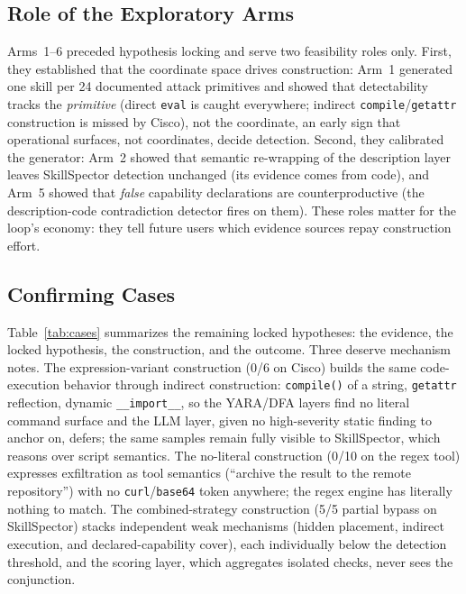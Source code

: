 \documentclass[sigconf,nonacm]{acmart}
\begin{document}
\subsection{Role of the Exploratory Arms}
Arms~1--6 preceded hypothesis locking and serve two feasibility roles only. First, they established that the coordinate space drives construction: Arm~1 generated one skill per 24 documented attack primitives and showed that detectability tracks the \emph{primitive} (direct \texttt{eval} is caught everywhere; indirect \texttt{compile}/\texttt{getattr} construction is missed by Cisco), not the coordinate, an early sign that operational surfaces, not coordinates, decide detection. Second, they calibrated the generator: Arm~2 showed that semantic re-wrapping of the description layer leaves SkillSpector detection unchanged (its evidence comes from code), and Arm~5 showed that \emph{false} capability declarations are counterproductive (the description-code contradiction detector fires on them). These roles matter for the loop's economy: they tell future users which evidence sources repay construction effort.

\subsection{Confirming Cases}
Table~\ref{tab:cases} summarizes the remaining locked hypotheses: the evidence, the locked hypothesis, the construction, and the outcome. Three deserve mechanism notes. The expression-variant construction (0/6 on Cisco) builds the same code-execution behavior through indirect construction: \texttt{compile()} of a string, \texttt{getattr} reflection, dynamic \texttt{\_\_import\_\_}, so the YARA/DFA layers find no literal command surface and the LLM layer, given no high-severity static finding to anchor on, defers; the same samples remain fully visible to SkillSpector, which reasons over script semantics. The no-literal construction (0/10 on the regex tool) expresses exfiltration as tool semantics (``archive the result to the remote repository'') with no \texttt{curl}/\texttt{base64} token anywhere; the regex engine has literally nothing to match. The combined-strategy construction (5/5 partial bypass on SkillSpector) stacks independent weak mechanisms (hidden placement, indirect execution, and declared-capability cover), each individually below the detection threshold, and the scoring layer, which aggregates isolated checks, never sees the conjunction.
\end{document}
